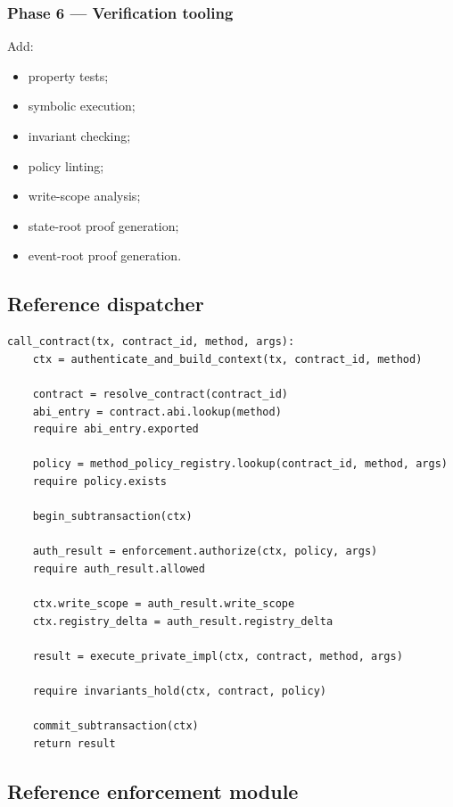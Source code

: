 \subsubsection{Phase 6 --- Verification tooling}

Add:

\begin{itemize}
  \item property tests;
  \item symbolic execution;
  \item invariant checking;
  \item policy linting;
  \item write-scope analysis;
  \item state-root proof generation;
  \item event-root proof generation.
\end{itemize}

\subsection{Reference dispatcher}

\begin{lstlisting}
call_contract(tx, contract_id, method, args):
    ctx = authenticate_and_build_context(tx, contract_id, method)

    contract = resolve_contract(contract_id)
    abi_entry = contract.abi.lookup(method)
    require abi_entry.exported

    policy = method_policy_registry.lookup(contract_id, method, args)
    require policy.exists

    begin_subtransaction(ctx)

    auth_result = enforcement.authorize(ctx, policy, args)
    require auth_result.allowed

    ctx.write_scope = auth_result.write_scope
    ctx.registry_delta = auth_result.registry_delta

    result = execute_private_impl(ctx, contract, method, args)

    require invariants_hold(ctx, contract, policy)

    commit_subtransaction(ctx)
    return result
\end{lstlisting}

\subsection{Reference enforcement module}

